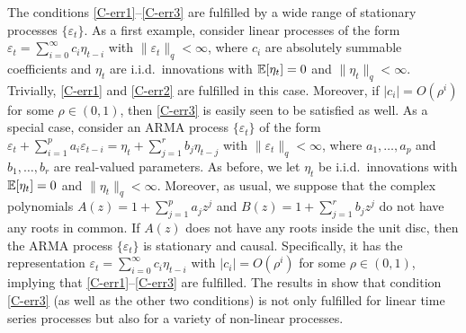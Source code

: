 The conditions \ref{C-err1}--\ref{C-err3} are fulfilled by a wide range of stationary processes $\{\varepsilon_t\}$. As a first example, consider linear processes of the form $\varepsilon_t = \sum\nolimits_{i=0}^{\infty} c_i \eta_{t-i}$ with $\| \varepsilon_t \|_q < \infty$, where $c_i$ are absolutely summable coefficients and $\eta_t$ are i.i.d.\ innovations with $\mathbb{E}[\eta_t] = 0$ and $\| \eta_t\|_q < \infty$. Trivially, \ref{C-err1} and \ref{C-err2} are fulfilled in this case. Moreover, if $|c_i| = O(\rho^i)$ for some $\rho \in (0,1)$, then \ref{C-err3} is easily seen to be satisfied as well. As a special case, consider an ARMA process $\{\varepsilon_t\}$ of the form $\varepsilon_t + \sum\nolimits_{i=1}^p a_i \varepsilon_{t-i} = \eta_t + \sum\nolimits_{j=1}^r b_j \eta_{t-j}$  with $\| \varepsilon_t \|_q < \infty$, where $a_1,\ldots,a_p$ and $b_1,\ldots,b_r$ are real-valued parameters. As before, we let $\eta_t$ be i.i.d.\ innovations with $\mathbb{E}[\eta_t] = 0$ and $\| \eta_t\|_q < \infty$. Moreover, as usual, we suppose that the complex polynomials $A(z) = 1 + \sum\nolimits_{j=1}^p a_jz^j$ and $B(z) = 1 + \sum\nolimits_{j=1}^r b_jz^j$ do not have any roots in common. If $A(z)$ does not have any roots inside the unit disc, then the ARMA process $\{ \varepsilon_t \}$ is stationary and causal. Specifically, it has the representation $\varepsilon_t = \sum\nolimits_{i=0}^{\infty} c_i \eta_{t-i}$ with $|c_i| = O(\rho^i)$ for some $\rho \in (0,1)$, implying that \ref{C-err1}--\ref{C-err3} are fulfilled. The results in \cite{WuShao2004} show that condition \ref{C-err3} (as well as the other two conditions) is not only fulfilled for linear time series processes but also for a variety of non-linear processes. 


